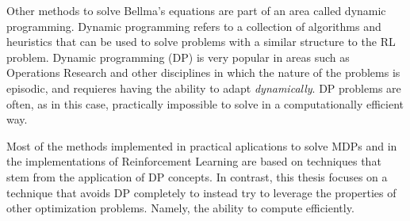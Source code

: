 Other methods to solve Bellma's equations are part of an area called dynamic
programming. Dynamic programming refers to a collection of algorithms and
heuristics that can be used to solve problems with a similar structure to the RL
problem. Dynamic programming (DP) is very popular in areas such as Operations
Research and other disciplines in which the nature of the problems is episodic,
and requieres having the ability to adapt \textit{dynamically}. DP problems are
often, as in this case, practically impossible to solve in a computationally
efficient way.

Most of the methods implemented in practical aplications to solve MDPs and in
the implementations of Reinforcement Learning are based on techniques that stem
from the application of DP concepts. In contrast, this thesis focuses on a
technique that avoids DP completely to instead try to leverage the properties of
other optimization problems. Namely, the ability to compute efficiently.
